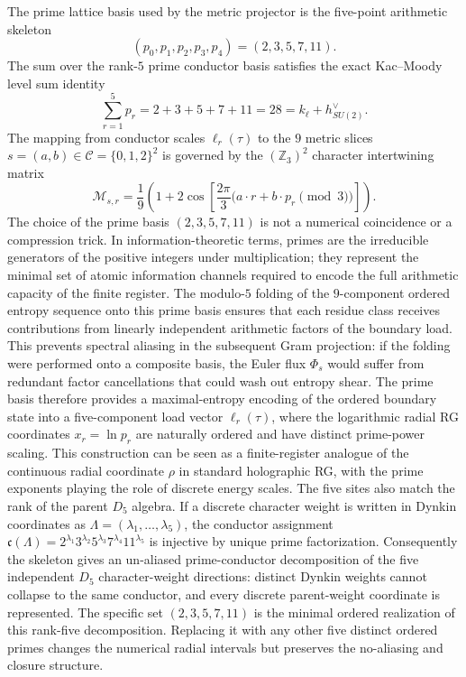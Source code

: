 \documentclass[11pt,letterpaper]{article}
\theoremstyle{plain}
\begin{document}
The prime lattice basis used by the metric projector is the five-point
arithmetic skeleton
\begin{equation}
\label{eq:section-five-prime-lattice-basis}
 (p_0,p_1,p_2,p_3,p_4)=(2,3,5,7,11).
\end{equation}
The sum over the rank-$5$ prime conductor basis satisfies the exact Kac--Moody level sum identity
\begin{equation}
\label{eq:section-five-prime-conductor-sum}
 \sum_{r=1}^5 p_r = 2 + 3 + 5 + 7 + 11 = 28 = k_\ell + h^\vee_{SU(2)}.
\end{equation}
The mapping from conductor scales $\ell_r(\tau)$ to the $9$ metric slices $s = (a,b) \in \mathcal{C} = \{0,1,2\}^2$ is governed by the $(\mathbb{Z}_3)^2$ character intertwining matrix
\begin{equation}
\label{eq:section-five-character-intertwining-matrix}
 \mathcal{M}_{s,r} = \frac{1}{9}\left(1 + 2\cos\left[\frac{2\pi}{3}\big(a\cdot r + b\cdot p_r \pmod 3\big)\right]\right).
\end{equation}
The choice of the prime basis \((2,3,5,7,11)\) is not a numerical coincidence or
a compression trick.  In information-theoretic terms, primes are the
irreducible generators of the positive integers under multiplication; they
represent the minimal set of atomic information channels required to encode the
full arithmetic capacity of the finite register.  The modulo-\(5\) folding of
the \(9\)-component ordered entropy sequence onto this prime basis ensures that
each residue class receives contributions from linearly independent arithmetic
factors of the boundary load.  This prevents spectral aliasing in the subsequent
Gram projection: if the folding were performed onto a composite basis, the
Euler flux \(\Phi_s\) would suffer from redundant factor cancellations that
could wash out entropy shear.  The prime basis therefore provides a
maximal-entropy encoding of the ordered boundary state into a five-component
load vector \(\ell_r(\tau)\), where the logarithmic radial RG coordinates
\(x_r=\ln p_r\) are naturally ordered and have distinct prime-power scaling.
This construction can be seen as a finite-register analogue of the continuous
radial coordinate \(\rho\) in standard holographic RG, with the prime exponents
playing the role of discrete energy scales.  The five sites also match the rank
of the parent \(D_5\) algebra.  If a discrete character weight is written in
Dynkin coordinates as \(\Lambda=(\lambda_1,\ldots,\lambda_5)\), the conductor
assignment
\(\mathfrak c(\Lambda)=2^{\lambda_1}3^{\lambda_2}5^{\lambda_3}
7^{\lambda_4}11^{\lambda_5}\) is injective by unique prime factorization.
Consequently the skeleton gives an un-aliased prime-conductor decomposition of
the five independent \(D_5\) character-weight directions: distinct Dynkin
weights cannot collapse to the same conductor, and every discrete parent-weight
coordinate is represented.  The specific set \((2,3,5,7,11)\) is the minimal
ordered realization of this rank-five decomposition.  Replacing it with any
other five distinct ordered primes changes the numerical radial intervals but
preserves the no-aliasing and closure structure.
\end{document}
